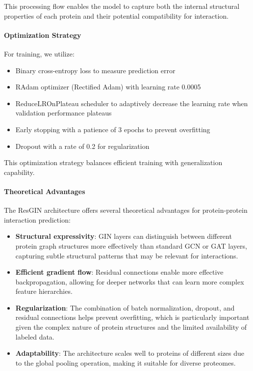\documentclass[conference]{IEEEtran}
\begin{document}
This processing flow enables the model to capture both the internal structural properties of each protein and their potential compatibility for interaction.

\paragraph{Optimization Strategy}
For training, we utilize:
\begin{itemize}
    \item Binary cross-entropy loss to measure prediction error
    \item RAdam optimizer (Rectified Adam) with learning rate 0.0005
    \item ReduceLROnPlateau scheduler to adaptively decrease the learning rate when validation performance plateaus
    \item Early stopping with a patience of 3 epochs to prevent overfitting
    \item Dropout with a rate of 0.2 for regularization
\end{itemize}

This optimization strategy balances efficient training with generalization capability.

\paragraph{Theoretical Advantages}
The ResGIN architecture offers several theoretical advantages for protein-protein interaction prediction:

\begin{itemize}
    \item \textbf{Structural expressivity}: GIN layers can distinguish between different protein graph structures more effectively than standard GCN or GAT layers, capturing subtle structural patterns that may be relevant for interactions.
    
    \item \textbf{Efficient gradient flow}: Residual connections enable more effective backpropagation, allowing for deeper networks that can learn more complex feature hierarchies.
    
    \item \textbf{Regularization}: The combination of batch normalization, dropout, and residual connections helps prevent overfitting, which is particularly important given the complex nature of protein structures and the limited availability of labeled data.
    
    \item \textbf{Adaptability}: The architecture scales well to proteins of different sizes due to the global pooling operation, making it suitable for diverse proteomes.
\end{itemize}
\end{document}
